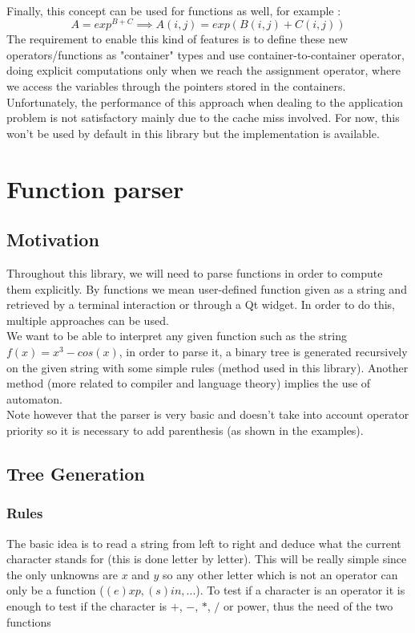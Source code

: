 \documentclass[a4paper]{report}
\begin{document}
\\
Finally, this concept can be used for functions as well, for example :
\[
A=exp^{B+C} \implies A(i,j)=exp(B(i,j)+C(i,j))
\]
The requirement to enable this kind of features is to define these new operators/functions as "container" types and use container-to-container operator, doing explicit computations only when we reach the assignment operator, where we access the variables through the pointers stored in the containers.
\\
Unfortunately, the performance of this approach when dealing to the application problem is not satisfactory mainly due to the cache miss involved. For now, this won't be used by default in this library but the implementation is available.
\chapter{Function parser}
\section{Motivation}
Throughout this library, we will need to parse functions in order to compute them explicitly. By functions we mean user-defined function given as a string and retrieved by a terminal interaction or through a Qt widget. In order to do this, multiple approaches can be used.\\
We want to be able to interpret any given function such as the string $f(x)=x^3-cos(x)$, in order to parse it, a binary tree is generated recursively on the given string with some simple rules (method used in this library). Another method (more related to compiler and language theory) implies the use of automaton.
\\
Note however that the parser is very basic and doesn't take into account operator priority so it is necessary to add parenthesis (as shown in the examples).
\section{Tree Generation}
\subsection{Rules}
The basic idea is to read a string from left to right and deduce what the current character stands for (this is done letter by letter).
This will be really simple since the only unknowns are $x$ and $y$ so any other letter which is not an operator can only be a function ($(e)xp,(s)in,...$).
To test if a character is an operator it is enough to test if the character is $+$, $-$, $*$, $/$ or power, thus the need of the two functions
\end{document}
